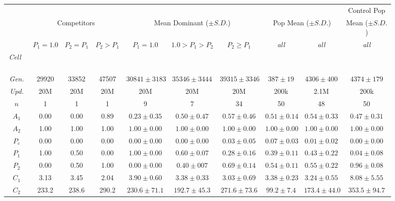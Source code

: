 \begin{figure*}%

\begin{center}
\setlength\tabcolsep{1.5pt} %
\begin{tabular}{ | c || c c c | c c c | c c | c | }
  \multicolumn{9}{c}{} & \multicolumn{1}{c}{Control Pop} \\
  \multicolumn{1}{c}{} & \multicolumn{3}{c}{Competitors} & \multicolumn{3}{c}{Mean Dominant ($\pm S.D.$)} & \multicolumn{2}{c}{Pop Mean ($\pm S.D.$)} & \multicolumn{1}{c}{Mean ($\pm S.D.$)} \\
 \cline{2-10}
  \multicolumn{1}{c|}{} & \tiny{$P_{1} = 1.0$} & \tiny{$P_{2} = P_{1}$} & \tiny{$P_{2} > P_{1}$} & \tiny{$P_{1} = 1.0$} & \tiny{$1.0 > P_{1} > P_{2}$} & \tiny{$P_{2} \geq P_{1}$} & \tiny{\textit{all}} & \tiny{\textit{all}} & \tiny{\textit{all}}  \\
 \hline
 \vspace{-1ex}
 \textit{Cell~~} & & & & & & & & & \\
 \textit{Gen.} & 29920 & 33852 & 47507 & $30841 \pm 3183$ & $35346 \pm 3444$ & $39315 \pm 3346$ & $387 \pm 19$ & $4306 \pm 400$  & $4374 \pm 179$ \\
 \textit{Upd.} & 20M & 20M & 20M & 20M & 20M & 20M & 200k & 2.1M & 200k \\
 $n$ & 1 & 1 & 1 & 9 & 7 & 34 & 50 & 48 & 50 \\
 \hhline{|=||===|===|==|=|}
 $A_1$ & 0.00 & 0.00 & 0.89 & $0.23 \pm 0.35$ & $0.50 \pm 0.47$ & $0.57 \pm 0.46$ & $0.51 \pm 0.14$ & $0.54 \pm 0.33$ & $0.47 \pm 0.31$\\
 $A_2$ & 1.00 & 1.00 & 1.00 & $1.00 \pm 0.00$ & $1.00 \pm 0.00$ & $1.00 \pm 0.00$ & $1.00 \pm 0.00$ & $1.00 \pm 0.00$ & $1.00 \pm 0.00$ \\
 \hline
 $P_{c}$ & 0.00 & 0.00 & 0.00 & $0.00 \pm 0.00$ & $0.00 \pm 0.00$ & $0.03 \pm 0.05$ & $0.07 \pm 0.03$ & $0.01 \pm 0.02$ & $0.00 \pm 0.00$ \\
 $P_1$ & 1.00 & 0.50 & 0.00 & $1.00 \pm 0.00$ & $0.60 \pm 0.07$ & $0.28 \pm 0.16$ & $0.39 \pm 0.11$ & $0.43 \pm 0.22$ & $0.04 \pm 0.08$ \\
 $P_2$ & 0.00 & 0.50 & 1.00 & $0.00 \pm 0.00$ & $0.40 \pm 007$ & $0.69 \pm 0.14$ & $0.54 \pm 0.11$ & $0.55 \pm 0.22$ & $0.96 \pm 0.08$ \\
 \hline
 $C_1$ & 3.13 & 3.45 & 2.04 & $3.90 \pm 0.60$ & $3.38 \pm 0.33$ & $3.03 \pm 0.69$ & $3.38 \pm 0.23$ & $3.24 \pm 0.55$ & $8.08 \pm 5.55$ \\
 $C_2$ & 233.2 & 238.6 & 290.2 & $230.6 \pm 71.1$ & $192.7 \pm 45.3$ & $271.6 \pm 73.6$ & $99.2 \pm 7.4$ & $173.4 \pm 44.0$ & $353.5 \pm 94.7$ \\

\end{tabular}
\end{center}
\end{figure*}
